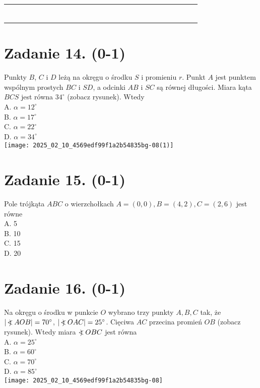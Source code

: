 \documentclass[10pt]{article}
\newcommand\Varangle{\mathop{{<\!\!\!\!\!\text{\small)}}\:}\nolimits}
\begin{document}
\begin{center}
\begin{tabular}{|c|c|c|c|c|c|c|c|c|c|c|c|c|c|c|c|c|c|c|c|c|c|c|c|}
\hline
 &  &  &  &  &  &  &  &  &  &  &  &  &  &  &  &  &  &  &  &  &  &  &  \\
\hline
 &  &  &  &  &  &  &  &  &  &  &  &  &  &  &  &  &  &  &  &  &  &  &  \\
\hline
 &  &  &  &  &  &  &  &  &  &  &  &  &  &  &  &  &  &  &  &  &  &  &  \\
\hline
 &  &  &  &  &  &  &  &  &  &  &  &  &  &  &  &  &  &  &  &  &  &  &  \\
\hline
 &  &  &  &  &  &  &  &  &  &  &  &  &  &  &  &  &  &  &  &  &  &  &  \\
\hline
 &  &  &  &  &  &  &  &  &  &  &  &  &  &  &  &  &  &  &  &  &  &  &  \\
\hline
 &  &  &  &  &  &  &  &  &  &  &  &  &  &  &  &  &  &  &  &  &  &  &  \\
\hline
\end{tabular}
\end{center}

\section*{Zadanie 14. (0-1)}
Punkty \(B\), \(C\) i \(D\) leżą na okręgu o środku \(S\) i promieniu \(r\). Punkt \(A\) jest punktem wspólnym prostych \(B C\) i \(S D\), a odcinki \(A B\) i \(S C\) są równej długości. Miara kąta \(B C S\) jest równa \(34^{\circ}\) (zobacz rysunek). Wtedy\\
A. \(\alpha=12^{\circ}\)\\
B. \(\alpha=17^{\circ}\)\\
C. \(\alpha=22^{\circ}\)\\
D. \(\alpha=34^{\circ}\)\\
\texttt{[image: 2025\_02\_10\_4569edf99f1a2b54835bg-08(1)]}

\section*{Zadanie 15. (0-1)}
Pole trójkąta \(A B C\) o wierzchołkach \(A=(0,0), B=(4,2), C=(2,6)\) jest równe\\
A. 5\\
B. 10\\
C. 15\\
D. 20

\section*{Zadanie 16. (0-1)}
Na okręgu o środku w punkcie \(O\) wybrano trzy punkty \(A, B, C\) tak, że \(|\Varangle A O B|=70^{\circ}\), \(|\Varangle O A C|=25^{\circ}\). Cięciwa \(A C\) przecina promień \(O B\) (zobacz rysunek). Wtedy miara \(\Varangle O B C\) jest równa\\
A. \(\alpha=25^{\circ}\)\\
B. \(\alpha=60^{\circ}\)\\
C. \(\alpha=70^{\circ}\)\\
D. \(\alpha=85^{\circ}\)\\
\texttt{[image: 2025\_02\_10\_4569edf99f1a2b54835bg-08]}
\end{document}
